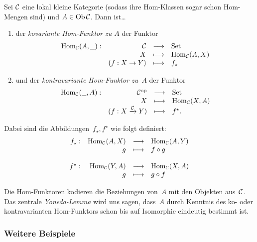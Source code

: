 \begin{defn}
Sei $\mathcal{C}$ eine lokal kleine Kategorie (sodass ihre Hom-Klassen sogar schon
Hom-Mengen sind) und $A \in \operatorname{Ob} \mathcal{C}$. Dann ist\ldots
\begin{enumerate}
  \item der \emph{kovariante Hom-Funktor zu $A$} der Funktor
    \[ \begin{array}{@{}rrcl@{}}
      \Hom_\C(A,\freist): & \C &\longrightarrow& \Set \\
      & X &\longmapsto& \Hom_\C(A,X) \\
      & (f:X \to Y) &\longmapsto& f_\star
    \end{array} \]
  \item und der \emph{kontravariante Hom-Funktor zu~$A$} der Funktor
    \[ \begin{array}{@{}rrcl@{}}
      \Hom_\C(\freist,A): & \C^\op &\longrightarrow& \Set \\
      & X &\longmapsto& \Hom_\C(X,A) \\
      & (f:X \xra{\C} Y) &\longmapsto& f^\star.
    \end{array} \]
\end{enumerate}
Dabei sind die Abbildungen~$f_\star, f^\star$ wie folgt definiert:
\[ \begin{array}{@{}rrcl@{}}
  f_\star: & \Hom_\C(A,X) &\longrightarrow& \Hom_\C(A,Y) \\
  & g &\longmapsto& f \circ g \\
  \\
  f^\star: & \Hom_\C(Y,A) &\longrightarrow& \Hom_\C(X,A) \\
  & g &\longmapsto& g \circ f
\end{array} \]
\end{defn}

Die Hom-Funktoren kodieren die Beziehungen von~$A$ mit den Objekten aus~$\mathcal{C}$.
Das zentrale \emph{Yoneda-Lemma} wird uns sagen, dass~$A$ durch Kenntnis des
ko- oder kontravarianten Hom-Funktors schon bis auf Isomorphie eindeutig
bestimmt ist.


\subsubsection{Weitere Beispiele}

